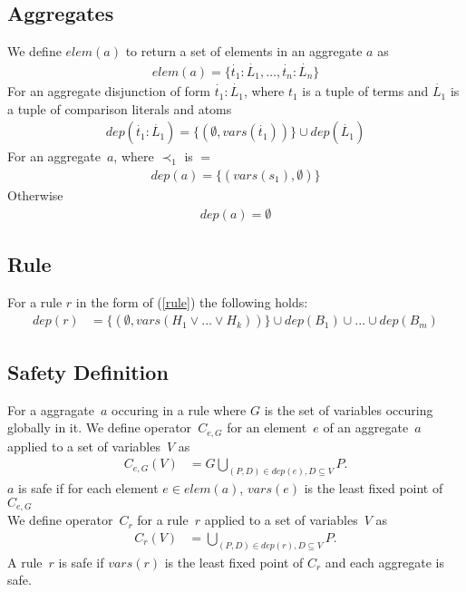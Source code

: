 \documentclass{article}
\newcommand{\tuple}[1]{\dot{#1}}
\newcommand{\set}[1]{\{#1\}}
\newcommand\Vars[1]{\mathit{vars}(#1)}
\newcommand\DP[1]{\mathit{dep}(#1)}
\newcommand\CheckOp[1]{C_{#1}}
\newcommand\CheckAp[2]{\CheckOp{#1}({#2})}
\begin{document}
	\subsection{Aggregates}
	We define $elem(a)$ to return a set of elements in an aggregate $a$ as
	\begin{align*}
		elem(a) = \set{\tuple{t_1} : \tuple{L_1}, \dots , \tuple{t_n} : \tuple{L_n}}
	\end{align*}
	For an aggregate disjunction of form $\tuple{t_1} : \tuple{L_1}$, where $t_1$ is a tuple of terms and $\tuple{L_1}$ is a tuple of comparison literals and atoms
	\begin{align*}
		dep(\tuple{t_1} : \tuple{L_1}) = \set{(\emptyset, vars(\tuple{t_1}))} \cup dep(\tuple{L_1})
	\end{align*}
	For an aggregate~$a$, where $\prec_1$ is $=$
	\begin{align*}
		dep(a) = \set{(vars(s_1), \emptyset)}
	\end{align*}
	Otherwise
	\begin{align*}
		dep(a) = \emptyset
	\end{align*}

	\subsection{Rule}
	For a rule $r$ in the form of (\ref{rule}) the following holds:
	\begin{align*}
		dep(r) &= \set{(\emptyset, vars(H_1\vee ... \vee H_k))} \cup dep(B_1) \cup ... \cup dep(B_m)
	\end{align*}

	\subsection{Safety Definition}
	For a aggragate~$a$ occuring in a rule where $G$ is the set of variables occuring globally in it.
	We define operator~$\CheckOp{e,G}$ for an element~$e$ of an aggregate~$a$ applied to a set of variables~$V$ as
	\begin{align*}
		\CheckAp{e,G}{V} &= G \bigcup_{(P,D) \in \DP{e}, D \subseteq V} P.
	\end{align*}
	$a$ is safe if for each element $e \in elem(a)$, $\Vars{e}$ is the least fixed point of $\CheckOp{e,G}$
	\\ We define operator~$\CheckOp{r}$ for a rule~$r$ applied to a set of variables~$V$ as
	\begin{align*}
	\CheckAp{r}{V} &= \bigcup_{(P,D) \in \DP{r}, D \subseteq V} P.
	\end{align*}
	A rule~$r$ is safe if $\Vars{r}$ is the least fixed point of $\CheckOp{r}$ and each aggregate is safe.
\end{document}
